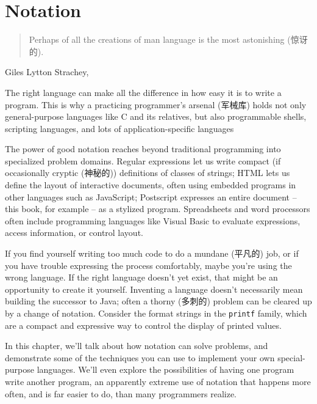 \chapter{Notation}
\label{chap:notation}
\begin{quote}
    Perhaps of all the creations of man language is the most astonishing
    (惊讶的).
\end{quote}
\begin{quotesrc}
    Giles Lytton Strachey, 
\end{quotesrc}

The right language can make all the difference in how easy it is to write a
program. This is why a practicing programmer's arsenal (军械库) holds not
only general-purpose languages like C and its relatives, but also
programmable shells, scripting languages, and lots of application-specific
languages

The power of good notation reaches beyond traditional programming into
specialized problem domains. Regular expressions let us write compact (if
occasionally cryptic (神秘的)) definitions of classes of strings; HTML lets
us define the layout of interactive documents, often using embedded
programs in other languages such as JavaScript; Postscript expresses an
entire document -- this book, for example -- as a stylized program.
Spreadsheets and word processors often include programming languages like
Visual Basic to evaluate expressions, access information, or control
layout.

If you find yourself writing too much code to do a mundane (平凡的) job, or
if you have trouble expressing the process comfortably, maybe you're using
the wrong language. If the right language doesn't yet exist, that might be
an opportunity to create it yourself. Inventing a language doesn't
necessarily mean building the successor to Java; often a thorny (多刺的)
problem can be cleared up by a change of notation. Consider the format
strings in the \verb'printf' family, which are a compact and expressive way
to control the display of printed values.

In this chapter, we'll talk about how notation can solve problems, and
demonstrate some of the techniques you can use to implement your own
special-purpose languages. We'll even explore the possibilities of having
one program write another program, an apparently extreme use of notation
that happens more often, and is far easier to do, than many programmers
realize.

